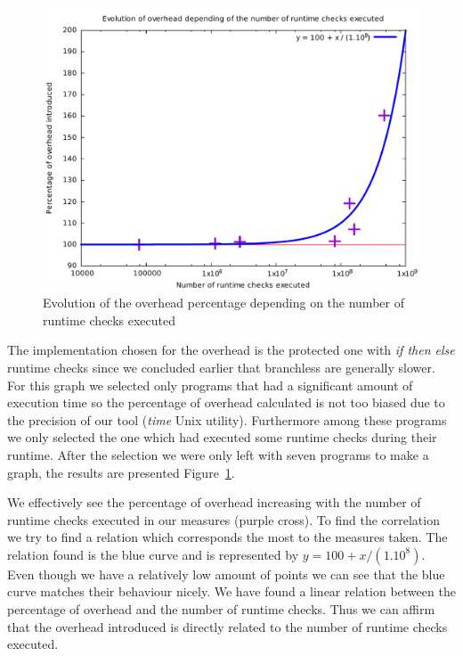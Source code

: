 \documentclass[11pt]{sdm}
\begin{document}
\begin{figure}[!ht]
\centering
\includegraphics[width=1\textwidth]{images/correlation_graph.pdf}
\caption{Evolution of the overhead percentage depending on the number of runtime checks executed}
\label{correlation_graph}
\end{figure}

The implementation chosen for the overhead is the protected one with \textit{if then else} runtime checks since we concluded earlier that branchless are generally slower.
For this graph we selected only programs that had a significant amount of execution time so the percentage of overhead calculated is not too biased due to the precision of our tool (\textit{time} Unix utility). Furthermore among these programs we only selected the one which had executed some runtime checks during their runtime. 
After the selection we were only left with seven programs to make a graph, the results are presented Figure~\ref{correlation_graph}.

We effectively see the percentage of overhead increasing with the number of runtime checks executed in our measures (purple cross). To find the correlation we try to find a relation which corresponds the most to the measures taken. The relation found is the blue curve and is represented by $y=100+x/(1.10^8)$. Even though we have a relatively low amount of points we can see that the blue curve matches their behaviour nicely. We have found a linear relation between the percentage of overhead and the number of runtime checks. Thus we can affirm that the overhead introduced is directly related to the number of runtime checks executed.
\end{document}

